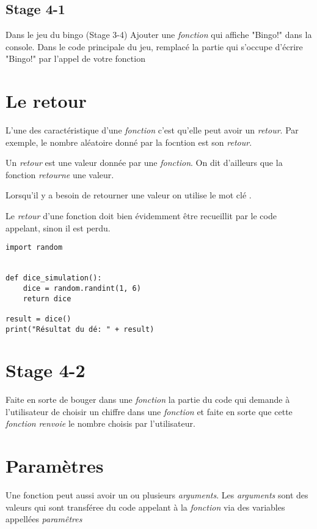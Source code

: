 \subsection{Stage 4-1}

Dans le jeu du bingo (Stage 3-4) Ajouter une \emph{fonction}  qui affiche "Bingo!" dans la console.
Dans le code principale du jeu, remplacé la partie qui s'occupe d'écrire "Bingo!" par l'appel de votre fonction

\section{Le retour}

L'une des caractéristique d'une \emph{fonction} c'est qu'elle peut avoir un \emph{retour}.
Par exemple, le nombre aléatoire donné par la focntion  est son \emph{retour}.

Un \emph{retour} est une valeur donnée par une \emph{fonction}. On dit d'ailleurs que la fonction \emph{retourne} une valeur.

Lorsqu'il y a besoin de retourner une valeur on utilise le mot clé .

Le \emph{retour} d'une fonction doit bien évidemment être recueillit par le code appelant, sinon il est perdu.

\begin{lstlisting}
import random


def dice_simulation():
	dice = random.randint(1, 6)
	return dice
	
result = dice()
print("Résultat du dé: " + result)	
\end{lstlisting}

\section{Stage 4-2}
Faite en sorte de bouger dans une \emph{fonction} la partie du code qui demande à l'utilisateur de choisir un chiffre dans une \emph{fonction} et faite en sorte que cette \emph{fonction} \emph{renvoie} le nombre choisis par l'utilisateur.

\section{Paramètres}

Une fonction peut aussi avoir un ou plusieurs \emph{arguments}. Les \emph{arguments} sont des valeurs qui sont transféree du code  appelant à la \emph{fonction} via des variables appellées \emph{paramêtres}

